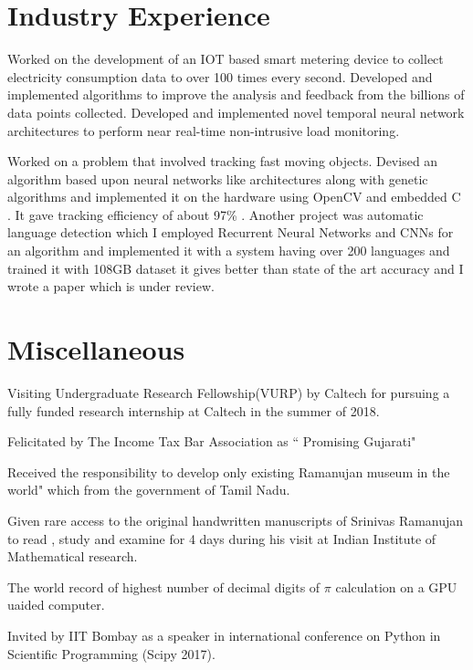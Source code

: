 \documentclass[]{deedy-resume-openfont}
\begin{document}
\section{Industry Experience}

Worked on the development of an IOT based smart metering device to collect electricity consumption data to over 100 times every second. Developed and implemented algorithms to improve the analysis and feedback from the billions of data points collected.
Developed and implemented novel temporal neural network architectures to perform near real-time  non-intrusive load monitoring.

\sectionsep

Worked on a problem that involved tracking fast moving objects. Devised an algorithm based upon neural networks like architectures along with genetic algorithms and implemented it on the hardware using OpenCV and embedded C . It gave tracking efficiency of about 97\% . 
Another project was automatic language detection which I employed Recurrent Neural Networks and CNNs for an algorithm and implemented it with a system having over 200 languages and trained it with 108GB dataset it gives better than state of the art accuracy and I wrote a paper which is under review.





\sectionsep



\section{Miscellaneous}
\hline
\vspace{\topsep}

\begin{tightemize}
\item Visiting Undergraduate Research Fellowship(VURP) by Caltech for pursuing a fully funded research internship at Caltech in the summer of 2018. 
\item Felicitated by The Income Tax Bar Association as “ Promising Gujarati"
\item Received the responsibility to develop \The only existing Ramanujan museum
in the world" which from the government of Tamil Nadu.
\item Given rare access to the original handwritten manuscripts of Srinivas Ramanujan to read , study and examine for 4 days during his visit at Indian Institute of Mathematical research.
\item The world record of highest number of decimal digits of $\pi$ calculation on a GPU uaided computer. 
\item Invited by IIT Bombay as a speaker in international conference on Python in Scientific Programming (Scipy 2017).
\end{tightemize}
\sectionsep
\end{document}
